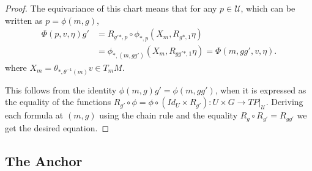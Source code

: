 \begin{proof}
The equivariance of this chart%
 means that for any $p \in \mathcal U$, which can be written as $p = \phi(m, g)$,
\begin{align*}
    \Phi(p, v, \eta) g' &=R_{g'*, p} \circ \phi_{*, p}(X_m, R_{g*, 1} \eta)\\
    &= \phi_{*, (m, gg')}(X_m, R_{gg'*, 1} \eta) = \Phi(m, gg', v, \eta).
\end{align*} where $X_m = \theta_{*, \theta^{-1}(m)} v \in T_m M$.

This follows from the identity $\phi(m, g) g' = \phi(m, gg')$, when it is expressed as the equality of the functions $R_{g'} \circ \phi = \phi \circ (Id_U \times R_{g'}) : U \times G \to TP|_{\mathcal U}$. Deriving each formula at $(m, g)$ using the chain rule and the equality $R_g \circ R_{g'} = R_{gg'}$ we get the desired equation.%


\end{proof}

\subsection{The Anchor}

